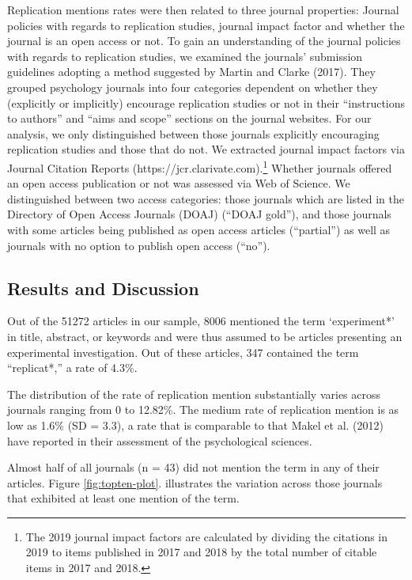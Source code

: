 \documentclass[]{elsarticle} %
\begin{document}
Replication mentions rates were then related to three journal properties: Journal policies with regards to replication studies, journal impact factor and whether the journal is an open access or not.
To gain an understanding of the journal policies with regards to replication studies, we examined the journals' submission guidelines adopting a method suggested by Martin and Clarke (2017).
They grouped psychology journals into four categories dependent on whether they (explicitly or implicitly) encourage replication studies or not in their ``instructions to authors'' and ``aims and scope'' sections on the journal websites. For our analysis, we only distinguished between those journals explicitly encouraging replication studies and those that do not.
We extracted journal impact factors via Journal Citation Reports (https://jcr.clarivate.com).\footnote{The 2019 journal impact factors are calculated by dividing the citations in 2019 to items published in 2017 and 2018 by the total number of citable items in 2017 and 2018.}
Whether journals offered an open access publication or not was assessed via Web of Science.
We distinguished between two access categories: those journals which are listed in the Directory of Open Access Journals (DOAJ) (``DOAJ gold''), and those journals with some articles being published as open access articles (``partial'') as well as journals with no option to publish open access (``no'').

\hypertarget{results-and-discussion}{%
\subsection{Results and Discussion}\label{results-and-discussion}}

Out of the 51272 articles in our sample, 8006 mentioned the term `experiment*' in title, abstract, or keywords and were thus assumed to be articles presenting an experimental investigation.
Out of these articles, 347 contained the term ``replicat*,'' a rate of 4.3\%.

The distribution of the rate of replication mention substantially varies across journals ranging from 0 to 12.82\%. The medium rate of replication mention is as low as 1.6\% (SD = 3.3), a rate that is comparable to that Makel et al. (2012) have reported in their assessment of the psychological sciences.

Almost half of all journals (n = 43) did not mention the term in any of their articles.
Figure \ref{fig:topten-plot}. illustrates the variation across those journals that exhibited at least one mention of the term.
\end{document}
